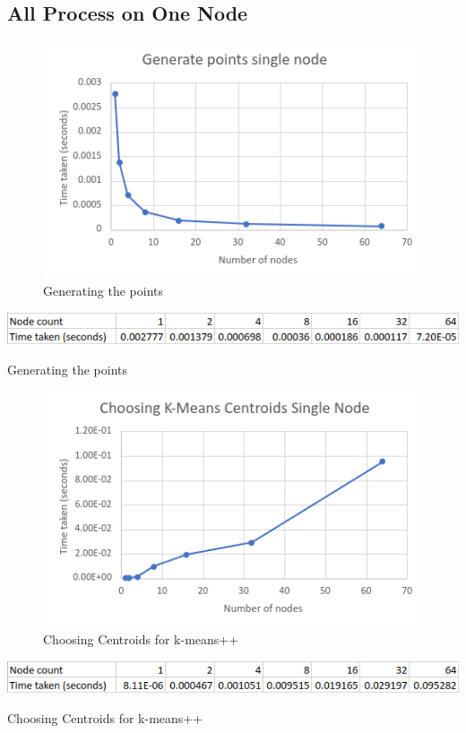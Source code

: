 \documentclass{article}
\begin{document}
\clearpage
\subsection*{All Process on One Node}
\begin{figure}[!htb]
\includegraphics[width=\textwidth]{single-node/generate-points.png}
\caption{Generating the points}
\label{fig:6}
\end{figure}
\begin{table}[!htb]
\includegraphics[width=\textwidth]{single-node/generate-points-table.png}
\caption{Generating the points}
\label{tab:6}
\end{table}

\clearpage
\begin{figure}[!htb]
\includegraphics[width=\textwidth]{single-node/choose-centroids.png}
\caption{Choosing Centroids for k-means++}
\label{fig:7}
\end{figure}
\begin{table}[!htb]
\includegraphics[width=\textwidth]{single-node/choose-centroids-table.png}
\caption{Choosing Centroids for k-means++}
\label{tab:7}
\end{table}
\end{document}
